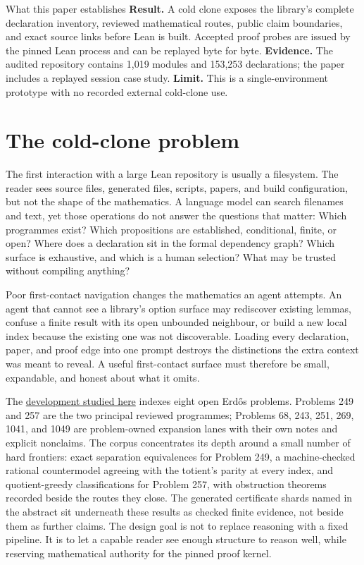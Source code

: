 \documentclass[11pt]{article}
\newcommand{\repobase}{https://github.com/wcook04/plectis-lean-erdos249-257}
\begin{document}
\begin{paperresult}{What this paper establishes}
\textbf{Result.} A cold clone exposes the library's complete declaration
inventory, reviewed mathematical routes, public claim boundaries, and exact
source links before Lean is built.  Accepted proof probes are issued by the
pinned Lean process and can be replayed byte for byte.  \textbf{Evidence.}
The audited repository contains 1,019 modules and 153,253 declarations; the
paper includes a replayed session case study.  \textbf{Limit.} This is a
single-environment prototype with no recorded external cold-clone use.
\end{paperresult}

\section{The cold-clone problem}\label{sec:problem}

The first interaction with a large Lean repository is usually a filesystem.
The reader sees source files, generated files, scripts, papers, and build
configuration, but not the shape of the mathematics. A language model can
search filenames and text, yet those operations do not answer the questions
that matter: Which programmes exist? Which propositions are established,
conditional, finite, or open? Where does a declaration sit in the formal
dependency graph? Which surface is exhaustive, and which is a human selection?
What may be trusted without compiling anything?

Poor first-contact navigation changes the mathematics an agent attempts. An
agent that cannot see a library's option surface may rediscover existing
lemmas, confuse a finite result with its open unbounded neighbour, or build a
new local index because the existing one was not discoverable. Loading every declaration,
paper, and proof edge into one prompt destroys the distinctions the extra
context was meant to reveal. A useful first-contact surface must therefore be
small, expandable, and honest about what it omits.

The \href{\repobase}{development studied here} indexes eight open
Erd\H{o}s problems. Problems 249 and 257 are the two principal reviewed
programmes; Problems 68, 243, 251, 269, 1041, and 1049 are problem-owned
expansion lanes with their own notes and explicit nonclaims. The corpus
concentrates its depth around a small number of hard frontiers: exact
separation equivalences for Problem 249, a machine-checked rational
countermodel agreeing with the totient's parity at every index, and
quotient-greedy classifications for Problem 257, with obstruction theorems
recorded beside the routes they close. The generated certificate shards named
in the abstract sit underneath these results as checked finite evidence, not
beside them as further claims. The design goal is not
to replace reasoning with a fixed pipeline. It is to let a capable reader see
enough structure to reason well, while reserving mathematical authority for
the pinned proof kernel.
\end{document}
